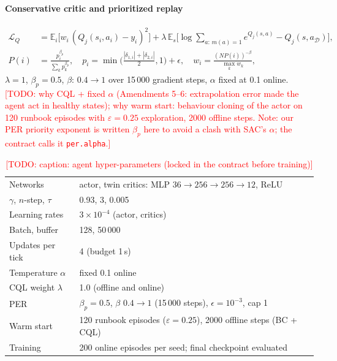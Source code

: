 \documentclass[conference,10pt]{IEEEtran}
\newcommand{\todo}[1]{\textcolor{red}{[TODO: #1]}}
\begin{document}
\paragraph*{Conservative critic and prioritized replay}
\begin{align}
\mathcal{L}_Q &= \mathbb{E}_i\big[w_i\,(Q_j(s_i,a_i)-y_i)^2\big]
 + \lambda\,\mathbb{E}_s\Big[\log\!\!\sum_{a:\,m(a)=1}\!\! e^{Q_j(s,a)} - Q_j(s,a_{\mathcal D})\Big],\\
P(i) &= \frac{p_i^{\beta_p}}{\sum_k p_k^{\beta_p}},\quad
p_i=\min\big(\tfrac{|\delta_{1,i}|+|\delta_{2,i}|}{2},1\big)+\epsilon,\quad
w_i=\frac{(N P(i))^{-\beta}}{\max_k w_k},
\end{align}
$\lambda=1$, $\beta_p=0.5$, $\beta$: $0.4\rightarrow1$ over 15\,000 gradient steps, $\alpha$ fixed at 0.1 online. \todo{why CQL + fixed $\alpha$ (Amendments 5--6: extrapolation error made the agent act in healthy states); why warm start: behaviour cloning of the actor on 120 runbook episodes with $\varepsilon=0.25$ exploration, 2000 offline steps. Note: our PER priority exponent is written $\beta_p$ here to avoid a clash with SAC's $\alpha$; the contract calls it \texttt{per.alpha}.}

\begin{table}[t]
\centering
\caption{\todo{caption: agent hyper-parameters (locked in the contract before training)}}
\label{tab:hparams}
\setlength{\tabcolsep}{3pt}
\begin{tabular}{@{}ll@{}}
\toprule
Networks & actor, twin critics: MLP $36\rightarrow256\rightarrow256\rightarrow12$, ReLU \\
$\gamma$, $n$-step, $\tau$ & 0.93, 3, 0.005 \\
Learning rates & $3\times10^{-4}$ (actor, critics) \\
Batch, buffer & 128, 50\,000 \\
Updates per tick & 4 (budget 1\,s) \\
Temperature $\alpha$ & fixed 0.1 online \\
CQL weight $\lambda$ & 1.0 (offline and online) \\
PER & $\beta_p=0.5$, $\beta$ $0.4\rightarrow1$ (15\,000 steps), $\epsilon=10^{-3}$, cap 1 \\
Warm start & 120 runbook episodes ($\varepsilon=0.25$), 2000 offline steps (BC + CQL) \\
Training & 200 online episodes per seed; final checkpoint evaluated \\
\bottomrule
\end{tabular}
\end{table}
\end{document}
